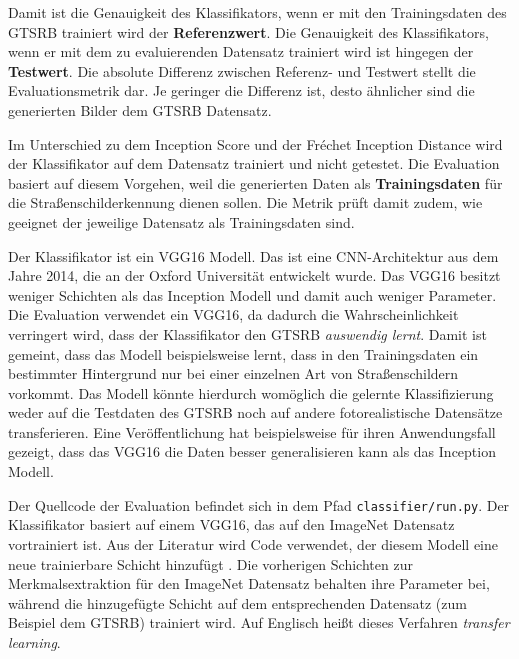 Damit ist die Genauigkeit des Klassifikators, wenn er mit den Trainingsdaten des \ac{GTSRB} trainiert wird der \textbf{Referenzwert}. Die Genauigkeit des Klassifikators, wenn er mit dem zu evaluierenden Datensatz trainiert wird ist hingegen der \textbf{Testwert}. Die absolute Differenz zwischen Referenz- und Testwert stellt die Evaluationsmetrik dar. Je geringer die Differenz ist, desto ähnlicher sind die generierten Bilder dem \ac{GTSRB} Datensatz.

Im Unterschied zu dem Inception Score und der Fréchet Inception Distance wird der Klassifikator auf dem Datensatz trainiert und nicht getestet. Die Evaluation basiert auf diesem Vorgehen, weil die generierten Daten als \textbf{Trainingsdaten} für die Straßenschilderkennung dienen sollen. Die Metrik prüft damit zudem, wie geeignet der jeweilige Datensatz als Trainingsdaten sind.

Der Klassifikator ist ein VGG16 Modell. Das ist eine \ac{CNN}-Architektur aus dem Jahre 2014, die an der Oxford Universität entwickelt wurde. Das VGG16 besitzt weniger Schichten als das Inception Modell und damit auch weniger Parameter. Die Evaluation verwendet ein VGG16, da dadurch die Wahrscheinlichkeit verringert wird, dass der Klassifikator den \ac{GTSRB} \emph{auswendig lernt}. Damit ist gemeint, dass das Modell beispielsweise lernt, dass in den Trainingsdaten ein bestimmter Hintergrund nur bei einer einzelnen Art von Straßenschildern vorkommt. Das Modell könnte hierdurch womöglich die gelernte Klassifizierung weder auf die Testdaten des \ac{GTSRB} noch auf andere fotorealistische Datensätze transferieren. Eine Veröffentlichung hat beispielsweise für ihren Anwendungsfall gezeigt, dass das VGG16 die Daten besser generalisieren kann als das Inception Modell. \cite{vgg16-vs-inception}

Der Quellcode der Evaluation befindet sich in dem Pfad \texttt{classifier/run.py}. Der Klassifikator basiert auf einem VGG16, das auf den ImageNet Datensatz vortrainiert ist. Aus der Literatur wird Code verwendet, der diesem Modell eine neue trainierbare Schicht hinzufügt \cite{transfer-learning}. Die vorherigen Schichten zur Merkmalsextraktion für den ImageNet Datensatz behalten ihre Parameter bei, während die hinzugefügte Schicht auf dem entsprechenden Datensatz (zum Beispiel dem \ac{GTSRB}) trainiert wird. Auf Englisch heißt dieses Verfahren \emph{transfer learning}. \cite{transfer-learning}

